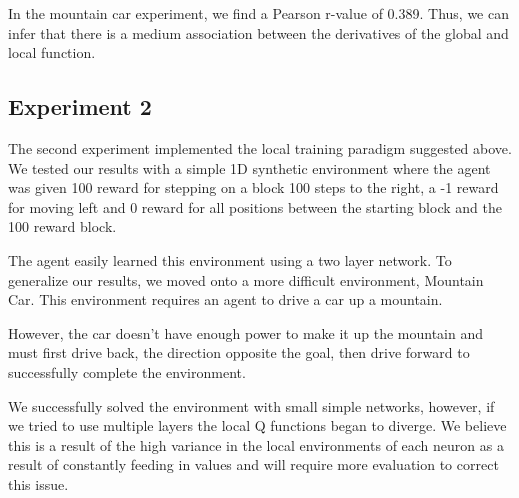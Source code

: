 In the mountain car experiment, we find a Pearson r-value of
0.389. Thus, we can infer that there is a medium association between the derivatives of the global and local function.

\subsection{Experiment 2}
The second experiment implemented the local training paradigm suggested above. We tested our results with a simple 1D synthetic environment where the agent was given 100 reward for stepping on a block 100 steps to the right, a -1 reward for moving left and 0 reward for all positions between the starting block and the 100 reward block.

The agent easily learned this environment using a two layer network. To generalize our results, we moved onto a more difficult environment, Mountain Car. This environment requires an agent to drive a car up a mountain. 

However, the car doesn't have enough power to make it up the mountain and must first drive back, the direction opposite the goal, then drive forward to successfully complete the environment. 

We successfully solved the environment with small simple networks, however, if we tried to use multiple layers the local Q functions began to diverge. We believe this is a result of the high variance in the local environments of each neuron as a result of constantly feeding in values and will require more evaluation to correct this issue.